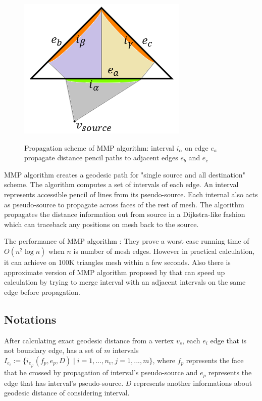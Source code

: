 \documentclass[a4paper,twoside]{article}
\begin{document}
\begin{figure}[!h]
	\centering
	{\includegraphics[width=0.75\columnwidth]{images/mmp_algorithm.png}}
	\caption{Propagation scheme of MMP algorithm: interval $i_{\alpha}$ on edge $e_a$ propagate distance pencil paths to adjacent edges $e_b$ and $e_c$ }
	\label{fig:mmp algorithm}
\end{figure}

MMP algorithm creates a geodesic path for "single source and all destination" scheme. The algorithm computes a set of intervals of each edge. An interval represents accessible pencil of lines from its pseudo-source. Each internal also acts as pseudo-source to propagate across faces of the rest of mesh. The algorithm propagates the distance information out from source in a Dijkstra-like fashion which can traceback any positions on mesh back to the source.

The performance of MMP algorithm : They prove a worst case
running time of $O(n^2 \log n)$ when $n$ is number of mesh edges. However in practical calculation, it can achieve on 100K triangles mesh within a few seconds. Also there is approximate version of MMP algorithm proposed by \cite{Surazhsky:2005:FEA:1073204.1073228} that can speed up calculation by trying to merge interval with an adjacent intervals on the same edge before propagation.

\subsection*{Notations}
After calculating exact geodesic distance from a vertex $v_s$, each $e_i$ edge that is not boundary edge, has a set of $m$ intervals $I_{e_i}:=\{ i_{e_{i^j}}(f_p,e_p,D) \mid i = 1, ... ,n_v , j = 1,...,m\}$, where $f_p$ represents the face that be crossed by propagation of interval's pseudo-source and $e_p$ represents the edge that has interval's pseudo-source. $D$ represents another informations about geodesic distance of considering interval.
\end{document}
